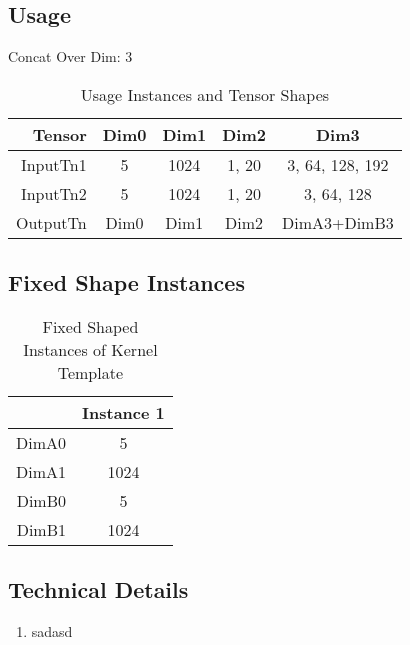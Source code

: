 \documentclass[•]{article}
\begin{document}
\subsection{Usage}
Concat Over Dim: 3
\vspace{0.5cm}
\begin{table}[htbp] %
\caption{Usage Instances and Tensor Shapes}
\label{tab:shapes_concat}
	\begin{center}
		\begin{tabular}{|r|c|c|c|c|} 
		\hline	
		Tensor & Dim0 & Dim1 & Dim2 & Dim3\\ 
		\hline	
		InputTn1 &
			5 &
			1024 &
			1, 20 &
			3, 64, 128, 192 \\ 
		\hline
		InputTn2 &
			5 & 
			1024 & 
			1, 20 & 
			3, 64, 128 \\
		\hline
		OutputTn &
			Dim0 & 
			Dim1 & 
			Dim2 & 
			DimA3+DimB3 \\
		\hline
		\end{tabular}
	\end{center}
\end{table}

\subsection{Fixed Shape Instances}
\begin{table}[htbp] %
\caption{Fixed Shaped Instances of Kernel Template}
\label{tab:shapes_concat}
	\begin{center}
		\begin{tabular}{|r|c|} 
		\hline	
		  & Instance 1\\ 
		\hline	
		DimA0 &
			5 \\ 
		\hline
		DimA1 & 
			1024\\
		\hline
		DimB0 & 
			5\\
		\hline
		DimB1 & 
			1024\\
		\hline
		\end{tabular}
	\end{center}
\end{table}

\subsection{Technical Details}
\begin{enumerate}
\item sadasd
\end{enumerate}
\end{document}
